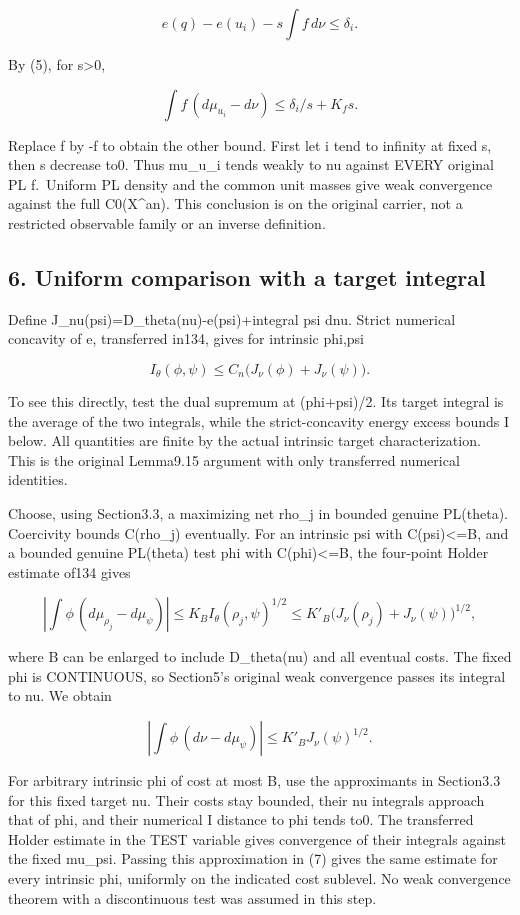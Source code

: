 \documentclass[
  10pt,
]{article}
\begin{document}
\[e(q)-e(u_i)-s\int f\,d\nu\leq\delta_i.\]

By (5), for s\textgreater0,

\[\int f\,(d\mu_{u_i}-d\nu)\leq\delta_i/s+K_f s.\]

Replace f by -f to obtain the other bound. First let i tend to infinity
at fixed s, then s decrease to0. Thus mu\_u\_i tends weakly to nu
against EVERY original PL f.~Uniform PL density and the common unit
masses give weak convergence against the full C0(X\^{}an). This
conclusion is on the original carrier, not a restricted observable
family or an inverse definition.

\subsection{6. Uniform comparison with a target
integral}\label{uniform-comparison-with-a-target-integral}

Define J\_nu(psi)=D\_theta(nu)-e(psi)+integral psi dnu. Strict numerical
concavity of e, transferred in134, gives for intrinsic phi,psi

\[I_\theta(\phi,\psi)\leq C_n\bigl(J_\nu(\phi)+J_\nu(\psi)\bigr).\tag{6}\]

To see this directly, test the dual supremum at (phi+psi)/2. Its target
integral is the average of the two integrals, while the strict-concavity
energy excess bounds I below. All quantities are finite by the actual
intrinsic target characterization. This is the original Lemma9.15
argument with only transferred numerical identities.

Choose, using Section3.3, a maximizing net rho\_j in bounded genuine
PL(theta). Coercivity bounds C(rho\_j) eventually. For an intrinsic psi
with C(psi)\textless=B, and a bounded genuine PL(theta) test phi with
C(phi)\textless=B, the four-point Holder estimate of134 gives

\[\left|\int\phi\,(d\mu_{\rho_j}-d\mu_\psi)\right|
\leq K_B I_\theta(\rho_j,\psi)^{1/2}
\leq K'_B\bigl(J_\nu(\rho_j)+J_\nu(\psi)\bigr)^{1/2},\]

where B can be enlarged to include D\_theta(nu) and all eventual costs.
The fixed phi is CONTINUOUS, so Section5's original weak convergence
passes its integral to nu. We obtain

\[\left|\int\phi\,(d\nu-d\mu_\psi)\right|
\leq K'_B J_\nu(\psi)^{1/2}.\tag{7}\]

For arbitrary intrinsic phi of cost at most B, use the approximants in
Section3.3 for this fixed target nu. Their costs stay bounded, their nu
integrals approach that of phi, and their numerical I distance to phi
tends to0. The transferred Holder estimate in the TEST variable gives
convergence of their integrals against the fixed mu\_psi. Passing this
approximation in (7) gives the same estimate for every intrinsic phi,
uniformly on the indicated cost sublevel. No weak convergence theorem
with a discontinuous test was assumed in this step.
\end{document}
